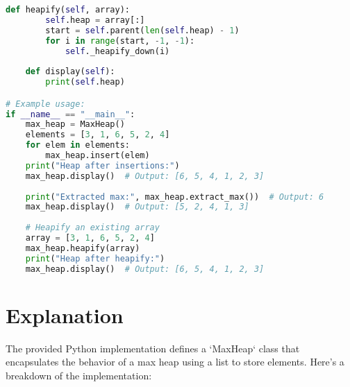 \begin{fullwidth}
\begin{lstlisting}[language=Python]
    def heapify(self, array):
        self.heap = array[:]
        start = self.parent(len(self.heap) - 1)
        for i in range(start, -1, -1):
            self._heapify_down(i)
    
    def display(self):
        print(self.heap)

# Example usage:
if __name__ == "__main__":
    max_heap = MaxHeap()
    elements = [3, 1, 6, 5, 2, 4]
    for elem in elements:
        max_heap.insert(elem)
    print("Heap after insertions:")
    max_heap.display()  # Output: [6, 5, 4, 1, 2, 3]
    
    print("Extracted max:", max_heap.extract_max())  # Output: 6
    max_heap.display()  # Output: [5, 2, 4, 1, 3]
    
    # Heapify an existing array
    array = [3, 1, 6, 5, 2, 4]
    max_heap.heapify(array)
    print("Heap after heapify:")
    max_heap.display()  # Output: [6, 5, 4, 1, 2, 3]
\end{lstlisting}
\end{fullwidth}

\section*{Explanation}

The provided Python implementation defines a `MaxHeap` class that encapsulates the behavior of a max heap using a list to store elements. Here's a breakdown of the implementation:

